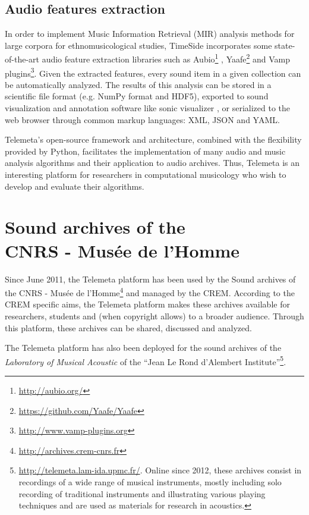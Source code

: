 \documentclass{sig-alternate}
\begin{document}
\subsection{Audio features extraction}
In order to implement Music Information Retrieval (MIR) analysis methods for large corpora for ethnomusicological studies, TimeSide incorporates some state-of-the-art audio feature extraction libraries such as Aubio\footnote{\url{http://aubio.org/}} \cite{brossierPhD}, Yaafe\footnote{\url{https://github.com/Yaafe/Yaafe}} \cite{yaafe_ISMIR2010} and Vamp plugins\footnote{ \url{http://www.vamp-plugins.org}}.
Given the extracted features, every sound item in a given collection can be automatically analyzed. The results of this analysis can be stored in a scientific file format (e.g. NumPy format and HDF5), exported to sound visualization and annotation software like sonic visualizer \cite{cannam2006sonic}, or serialized to the web browser through common markup languages: XML, JSON and YAML.

Telemeta's open-source framework and architecture, combined with the flexibility provided by Python, facilitates the implementation of many audio and music analysis algorithms and their application to audio archives. Thus, Telemeta is an interesting platform for researchers in computational musicology who wish to develop and evaluate their algorithms.


\section{Sound archives of the \\CNRS - Musée de l'Homme}\label{sec:archives-CREM}
Since June 2011, the Telemeta platform has been used by the  Sound archives of the CNRS - Musée de l'Homme\footnote{\url{http://archives.crem-cnrs.fr}} and managed by the CREM. According to the CREM specific aims, the Telemeta platform makes these archives available for researchers, students and (when copyright allows) to a broader audience. Through this platform, these archives can be shared, discussed and analyzed.

The Telemeta platform has also been deployed for the sound archives of the \emph{Laboratory of Musical Acoustic} of the ``Jean Le Rond d'Alembert Institute''\footnote{\url{http://telemeta.lam-ida.upmc.fr/}. Online since 2012, these archives consist in recordings of a wide range of musical instruments, mostly including solo recording of traditional instruments and illustrating various playing techniques and are used as materials for research in acoustics.}.
\end{document}
